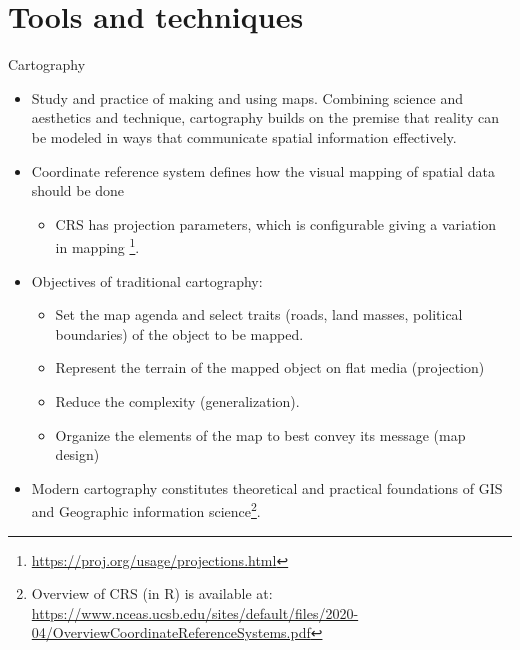 \documentclass[11pt,dvipsnames,ignorenonframetext,aspectratio=169]{beamer}
\providecommand{\tightlist}{%
  \setlength{\itemsep}{0pt}\setlength{\parskip}{0pt}}
\begin{document}
\hypertarget{tools-and-techniques}{%
\section{Tools and techniques}\label{tools-and-techniques}}

\begin{frame}{Cartography}
\protect\hypertarget{cartography}{}
\begin{itemize}
\tightlist
\item
  Study and practice of making and using maps. Combining science and
  aesthetics and technique, cartography builds on the premise that
  reality can be modeled in ways that communicate spatial information
  effectively.
\item
  Coordinate reference system defines how the visual mapping of spatial
  data should be done

  \begin{itemize}
  \tightlist
  \item
    CRS has projection parameters, which is configurable giving a
    variation in mapping
    \footnote[frame]{\url{https://proj.org/usage/projections.html}}.
  \end{itemize}
\item
  Objectives of traditional cartography:

  \begin{itemize}
  \tightlist
  \item
    Set the map agenda and select traits (roads, land masses, political
    boundaries) of the object to be mapped.
  \item
    Represent the terrain of the mapped object on flat media
    (projection)
  \item
    Reduce the complexity (generalization).
  \item
    Organize the elements of the map to best convey its message (map
    design)
  \end{itemize}
\item
  Modern cartography constitutes theoretical and practical foundations
  of GIS and Geographic information
  science\footnote[frame]{Overview of CRS (in R) is available at: \url{https://www.nceas.ucsb.edu/sites/default/files/2020-04/OverviewCoordinateReferenceSystems.pdf}}.
\end{itemize}
\end{frame}
\end{document}
